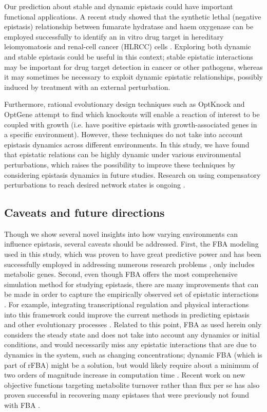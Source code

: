 Our prediction about stable and dynamic epistasis could have important
functional applications. A recent study showed that the synthetic
lethal (negative epistasis) relationship between fumarate hydratase
and haem oxygenase can be employed successfully to identify an in
vitro drug target in hereditary leiomyomatosis and renal-cell cancer
(HLRCC) cells \citep{Frezza2011}. Exploring both dynamic and stable
epistasis could be useful in this context; stable epistatic
interactions may be
important for drug target detection in cancer or other pathogens,
whereas it may sometimes be necessary to exploit dynamic epistatic
relationships, possibly induced by treatment with an external
perturbation.

Furthermore, rational evolutionary design techniques such as OptKnock
\citep{Burgard2003} and OptGene \citep{Patil2005} attempt to find
which knockouts will enable a reaction of interest to be coupled with
growth (i.e. have positive
epistasis with growth-associated genes in a specific
environment). However, these techniques do not take into account
epistasis dynamics across different environments. In this study, we
have found that epistatic relations can be highly dynamic under
various environmental perturbations, which raises the possibility to
improve these techniques by considering epistasis dynamics in future
studies. Research on using compensatory perturbations to reach desired
network states is ongoing \citep{Cornelius2011}.

\subsection{Caveats and future directions} Though we show several
novel insights into how varying environments can influence epistasis,
several caveats should be addressed. First, the FBA modeling used in
this study, which was proven to have great predictive power and has
been successfully employed in addressing numerous research problems
\citep{Edwards2001, Shlomi2005, Smallbone2009a}, 
only includes metabolic genes. Second, even though FBA
offers the most comprehensive simulation method for studying
epistasis, there are many improvements that can be made in order to
capture the empirically observed set of epistatic interactions
\citep{Covert2001}. For example, integrating transcriptional
regulation and physical interactions into this framework could improve
the current methods in predicting epistasis and other evolutionary
processes \citep{Szappanos2011}. Related to
this point, FBA as used herein only considers the steady state and
does not take into account any dynamics or initial conditions, and
would necessarily miss any epistatic interactions that are due to
dynamics in the system, such as changing concentrations; dynamic FBA
(which is part of rFBA) might be a solution, but would likely require
about a minimum of two orders of magnitude increase in computation
time \citep{Covert2001, Varma1994}. Recent work
on new objective functions targeting metabolite turnover rather than
flux per se has also proven successful in recovering many epistases
that were previously not found with FBA \citep{Brochado2012}.

